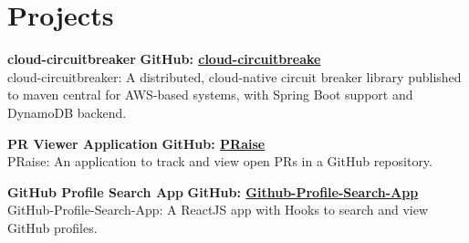 \documentclass[a4paper,10pt]{article}
\begin{document}
\section*{Projects}
\textbf{cloud-circuitbreaker} \hfill \textbf{GitHub: \href{https://github.com/clinton1719/cloud-circuitbreaker}{cloud-circuitbreake}} \\
cloud-circuitbreaker: A distributed, cloud-native circuit breaker library published to maven central for AWS-based systems, with Spring Boot support and DynamoDB backend.

\textbf{PR Viewer Application} \hfill \textbf{GitHub: \href{https://github.com/clinton1719/praise}{PRaise}} \\
PRaise: An application to track and view open PRs in a GitHub repository.

\textbf{GitHub Profile Search App} \hfill \textbf{GitHub: \href{https://github.com/clinton1719/Github-Profile-Search-App}{Github-Profile-Search-App}} \\
GitHub-Profile-Search-App: A ReactJS app with Hooks to search and view GitHub profiles.
\end{document}
